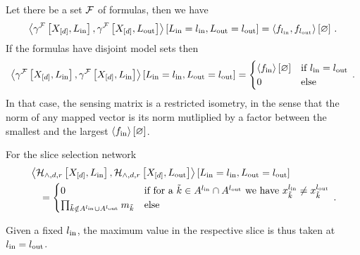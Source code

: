 \begin{example}
	Let there be a set $\mathcal{F}$ of formulas, then we have
	\begin{align*}
		\left\langle \gamma^{\mathcal{F}}\left[X_{[d]},L_{\mathrm{in}}\right],\gamma^{\mathcal{F}}\left[X_{[d]},L_{\mathrm{out}}\right]\right\rangle \left[ L_{\mathrm{in}}=l_{\mathrm{in}},L_{\mathrm{out}}=l_{\mathrm{out}} \right]
		= \left\langle f_{l_{\mathrm{in}}}, f_{l_{\mathrm{out}}}\right\rangle \left[ \varnothing \right] \, . 
	\end{align*}
	If the formulas have disjoint model sets then 
	\begin{align*}
		\left\langle \gamma^{\mathcal{F}}\left[X_{[d]},L_{\mathrm{in}}\right],\gamma^{\mathcal{F}}\left[X_{[d]},L_{\mathrm{in}}\right]\right\rangle \left[ L_{\mathrm{in}}=l_{\mathrm{in}},L_{\mathrm{out}}=l_{\mathrm{out}} \right]
		= \begin{cases}
			\left\langle f_{\mathrm{in}}\right\rangle \left[ \varnothing \right] & \text{if } l_{\mathrm{in}}=l_{\mathrm{out}} \\
			0 & \text{else} 
		\end{cases} \, . 
	\end{align*}
	In that case, the sensing matrix is a restricted isometry, in the sense that the norm of any mapped vector is its norm mutliplied by a factor between the smallest and the largest $\left\langle f_{\mathrm{in}}\right\rangle \left[ \varnothing \right]$.
\end{example}


\begin{example}

	For the slice selection network
	\begin{align*}
		& \left\langle \mathcal{H}_{\land,d,r}\left[X_{[d]},L_{\mathrm{in}}\right],\mathcal{H}_{\land,d,r}\left[X_{[d]},L_{\mathrm{out}}\right]\right\rangle \left[ L_{\mathrm{in}}=l_{\mathrm{in}},L_{\mathrm{out}}=l_{\mathrm{out}} \right] \\
		& \quad = \begin{cases}
			0 & \text{if for a }\tilde{k}\in A^{l_{\mathrm{in}}}\cap A^{l_{\mathrm{out}}}\text{ we have }x_{\tilde{k}}^{l_{\mathrm{in}}}\neq x_{\tilde{k}}^{l_{\mathrm{out}}} \\
			\prod_{\tilde{k}\notin A^{l_{\mathrm{in}}}\cup A^{l_{\mathrm{out}}}} m_{\tilde{k}}& \text{else} 
		\end{cases} \, . 
	\end{align*}

	Given a fixed $l_{\mathrm{in}}$, the maximum value in the respective slice is thus taken at $l_{\mathrm{in}}=l_{\mathrm{out}}$.
\end{example}


